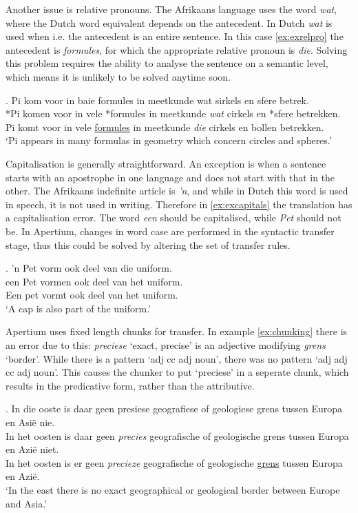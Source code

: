 \documentclass[11pt]{article}
\begin{document}
Another issue is relative pronouns. The Afrikaans language uses the word {\em wat}, where the
Dutch word equivalent depends on the antecedent. In Dutch {\em wat} is used when i.e. the antecedent
is an entire sentence. In this case \ref{ex:exrelpro} the antecedent is {\em formules}, for which the appropriate
relative pronoun is {\em die}. Solving this problem requires the ability to analyse the
sentence on a semantic level, which means it is unlikely to be solved anytime soon.

\ex. \label{ex:exrelpro}
    Pi kom voor in baie formules in meetkunde wat sirkels en sfere betrek. \\
    *Pi komen voor in vele *formules in meetkunde {\em wat} cirkels en *sfere betrekken. \\
    Pi komt voor in vele \underline{formules} in meetkunde {\em die} cirkels en bollen betrekken. \\
    `Pi appears in many formulas in geometry which concern circles and spheres.' 

Capitalisation is generally straightforward. An exception is when a sentence
starts with an apostrophe in one language and does not start with that in the other. The Afrikaans
indefinite article is \emph{'n}, and while in Dutch this word is used in speech, it is 
not used in writing. Therefore in \ref{ex:excapitals} the translation has a 
capitalisation error. The word \emph{een} should be capitalised, while \emph{Pet} should not 
be. In Apertium, changes in word case are performed in the syntactic transfer stage, thus this 
could be solved by altering the set of transfer rules.

\ex. \label{ex:excapitals} 
    'n Pet vorm ook deel van die uniform. \\
    een Pet vormen ook deel van het uniform. \\
    Een pet vormt ook deel van het uniform. \\
    `A cap is also part of the uniform.' 

Apertium uses fixed length chunks for transfer. In example \ref{ex:chunking} there is an error
due to this: \emph{preciese} `exact, precise' is an adjective modifying \emph{grens} `border'. While 
there is a pattern
`adj cc adj noun', there was no pattern `adj adj cc adj noun'. This causes the chunker to put
`preciese' in a seperate chunk, which results in the predicative form, rather than the attributive.

\ex. \label{ex:chunking}
    In die ooste is daar geen presiese geografiese of geologiese grens tussen Europa en Asië nie. \\
    In het oosten is daar geen {\em precies} geografische of geologische grens tussen Europa en Azië niet. \\ 
    In het oosten is er geen {\em precieze} geografische of geologische \underline{grens} tussen Europa en Azië. \\
    `In the east there is no exact geographical or geological border between Europe and Asia.' 
\end{document}
